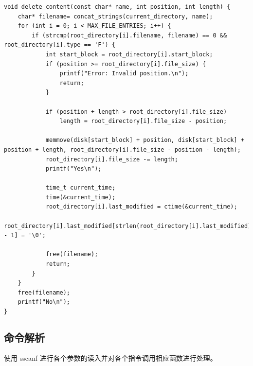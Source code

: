 \documentclass{article}
\begin{document}
\begin{lstlisting}
void delete_content(const char* name, int position, int length) {
    char* filename= concat_strings(current_directory, name);
    for (int i = 0; i < MAX_FILE_ENTRIES; i++) {
        if (strcmp(root_directory[i].filename, filename) == 0 && root_directory[i].type == 'F') {
            int start_block = root_directory[i].start_block;  
            if (position >= root_directory[i].file_size) {
                printf("Error: Invalid position.\n");
                return;
            }

            if (position + length > root_directory[i].file_size)
                length = root_directory[i].file_size - position;

            memmove(disk[start_block] + position, disk[start_block] + position + length, root_directory[i].file_size - position - length);
            root_directory[i].file_size -= length;
            printf("Yes\n");

            time_t current_time;
            time(&current_time);
            root_directory[i].last_modified = ctime(&current_time);
            root_directory[i].last_modified[strlen(root_directory[i].last_modified) - 1] = '\0';

            free(filename);
            return;
        }
    }
    free(filename);
    printf("No\n");
}
\end{lstlisting}

\subsection{命令解析}

使用 sscanf 进行各个参数的读入并对各个指令调用相应函数进行处理。
\end{document}
